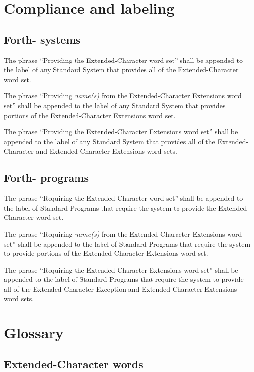 \section{Compliance and labeling} %

\subsection{Forth-\snapshot{} systems} %

The phrase ``Providing the Extended-Character word set'' shall be
appended to the label of any Standard System that provides all of
the Extended-Character word set.

The phrase ``Providing \emph{name(s)} from the Extended-Character
Extensions word set'' shall be appended to the label of any Standard
System that provides portions of the Extended-Character Extensions
word set.

The phrase ``Providing the Extended-Character Extensions word set''
shall be appended to the label of any Standard System that provides
all of the Extended-Character and Extended-Character Extensions
word sets.

\subsection{Forth-\snapshot{} programs} %

The phrase ``Requiring the Extended-Character word set'' shall be
appended to the label of Standard Programs that require the system
to provide the Extended-Character word set.

The phrase ``Requiring \emph{name(s)} from the Extended-Character
Extensions word set'' shall be appended to the label of Standard Programs
that require the system to provide portions of the Extended-Character
Extensions word set.

The phrase ``Requiring the Extended-Character Extensions word set''
shall be appended to the label of Standard Programs that require the
system to provide all of the Extended-Character Exception and
Extended-Character Extensions word sets.

\section{Glossary} %
\vspace{1ex}

\subsection{Extended-Character words} %
\vspace{1ex}

